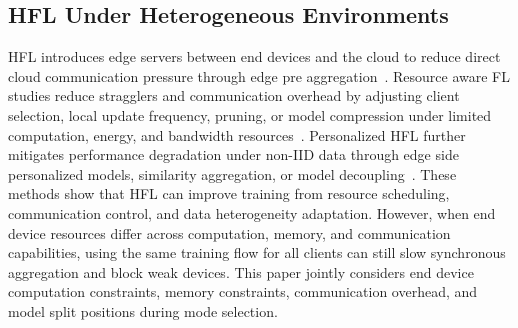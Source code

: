 ﻿\documentclass[preprint,12pt]{elsarticle}
\theoremstyle{plain}
\theoremstyle{definition}
\theoremstyle{remark}
\begin{document}
\subsection{HFL Under Heterogeneous Environments}
HFL introduces edge servers between end devices and the cloud to reduce direct cloud communication pressure through edge pre aggregation~\cite{hfl}.
Resource aware FL studies reduce stragglers and communication overhead by adjusting client selection, local update frequency, pruning, or model compression under limited computation, energy, and bandwidth resources~\cite{phfl,xu2022adaptive,wang2019adaptivefl,dinh2021wirelessfl}.
Personalized HFL further mitigates performance degradation under non-IID data through edge side personalized models, similarity aggregation, or model decoupling~\cite{Personalizedhfl,JSJX202502007}.
These methods show that HFL can improve training from resource scheduling, communication control, and data heterogeneity adaptation.
However, when end device resources differ across computation, memory, and communication capabilities, using the same training flow for all clients can still slow synchronous aggregation and block weak devices.
This paper jointly considers end device computation constraints, memory constraints, communication overhead, and model split positions during mode selection.
\end{document}
